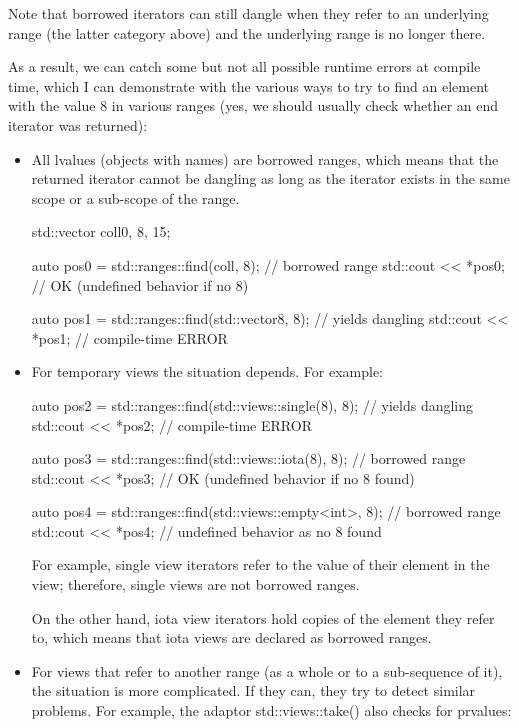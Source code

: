 Note that borrowed iterators can still dangle when they refer to an underlying range (the latter category above) and the underlying range is no longer there.

As a result, we can catch some but not all possible runtime errors at compile time, which I can demonstrate with the various ways to try to find an element with the value 8 in various ranges (yes, we should usually check whether an end iterator was returned):

\begin{itemize}
\item
All lvalues (objects with names) are borrowed ranges, which means that the returned iterator cannot be dangling as long as the iterator exists in the same scope or a sub-scope of the range.

\begin{cpp}
std::vector coll{0, 8, 15};

auto pos0 = std::ranges::find(coll, 8); // borrowed range
std::cout << *pos0; // OK (undefined behavior if no 8)

auto pos1 = std::ranges::find(std::vector{8}, 8); // yields dangling
std::cout << *pos1; // compile-time ERROR
\end{cpp}

\item
For temporary views the situation depends. For example:

\begin{cpp}
auto pos2 = std::ranges::find(std::views::single(8), 8); // yields dangling
std::cout << *pos2; // compile-time ERROR

auto pos3 = std::ranges::find(std::views::iota(8), 8); // borrowed range
std::cout << *pos3; // OK (undefined behavior if no 8 found)

auto pos4 = std::ranges::find(std::views::empty<int>, 8); // borrowed range
std::cout << *pos4; // undefined behavior as no 8 found
\end{cpp}

For example, single view iterators refer to the value of their element in the view; therefore, single views are not borrowed ranges.

On the other hand, iota view iterators hold copies of the element they refer to, which means that iota views are declared as borrowed ranges.

\item
For views that refer to another range (as a whole or to a sub-sequence of it), the situation is more complicated. If they can, they try to detect similar problems. For example, the adaptor std::views::take() also checks for prvalues:


\end{itemize}

